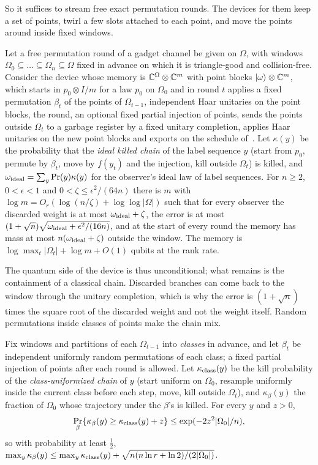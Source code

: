 So it suffices to stream free exact permutation rounds. The devices for them keep a set of points, twirl a few slots attached to each
point, and move the points around inside fixed windows.

\begin{theorem}\label{thm:pointblock}
Let a free permutation round of a gadget channel be given on $\Omega$, with windows $\Omega_0\subseteq\dots\subseteq\Omega_n\subseteq\Omega$ fixed in advance
on which it is triangle-good and collision-free. Consider the device whose memory is $\mathbb C^{\Omega}\otimes\mathbb C^m$ with point blocks
$\lvert \omega\rangle\otimes\mathbb C^m$, which starts in $p_0\otimes I/m$ for a law $p_0$ on $\Omega_0$ and in round $t$ applies a fixed permutation $\beta_t$ of the points of
$\Omega_{t-1}$, independent Haar unitaries on the point blocks, the round, an optional fixed partial injection of points, sends the points outside
$\Omega_t$ to a garbage register by a fixed unitary completion, applies Haar unitaries on the new point blocks and exports on the schedule
of~\cite[Theorem~12.2]{DouglasMghirbiC}. Let $\kappa(y)$ be the probability that the \emph{ideal killed chain} of the label sequence $y$ (start from
$p_0$, permute by $\beta_t$, move by $f(y_t)$ and the injection, kill outside $\Omega_t$) is killed, and $\omega_{\rm ideal}=\sum_y\Pr(y)\kappa(y)$ for the
observer's ideal law of label sequences. For $n\ge2$, $0<\epsilon<1$ and $0<\zeta\le\epsilon^2/(64n)$ there is $m$ with
$\log m=O_r(\log(n/\zeta)+\log\log|\Omega|)$ such that for every observer the discarded weight is at most $\omega_{\rm ideal}+\zeta$, the error is at most
$(1+\sqrt n)\sqrt{\omega_{\rm ideal}+\epsilon^2/(16n)}$, and at the start of every round the memory has mass at most $n(\omega_{\rm ideal}+\zeta)$ outside the
window. The memory is $\log\max_t|\Omega_t|+\log m+O(1)$ qubits at the rank rate.
\end{theorem}

The quantum side of the device is thus unconditional; what remains is the containment of a classical chain. Discarded branches can come back to
the window through the unitary completion, which is why the error is $(1+\sqrt n)$ times the square root of the discarded weight and not the
weight itself. Random permutations inside classes of points make the chain mix.

\begin{lemma}\label{lem:classperm}
Fix windows and partitions of each $\Omega_{t-1}$ into \emph{classes} in advance, and let $\beta_t$ be independent uniformly random permutations of
each class; a fixed partial injection of points after each round is allowed. Let $\kappa_{\rm class}(y)$ be the kill probability of the
\emph{class-uniformized chain} of $y$ (start uniform on $\Omega_0$, resample uniformly inside the current class before each step, move, kill
outside $\Omega_t$), and $\kappa_\beta(y)$ the fraction of $\Omega_0$ whose trajectory under the $\beta$'s is killed. For every $y$ and $z>0$,
\[
\Pr_\beta\{\kappa_\beta(y)\ge\kappa_{\rm class}(y)+z\}\le\exp(-2z^2|\Omega_0|/n),
\]
so with probability at least $\frac12$, $\max_y\kappa_\beta(y)\le\max_y\kappa_{\rm class}(y)+\sqrt{n(n\ln r+\ln2)/(2|\Omega_0|)}$.
\end{lemma}

